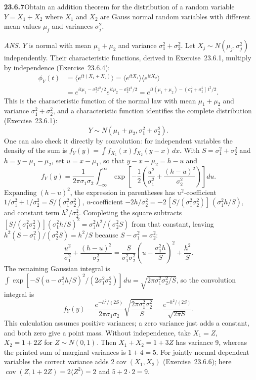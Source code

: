 \par\bigskip
\noindent\textbf{23.6.7}\quad Obtain an addition theorem for the
distribution of a random variable $Y=X_{1}+X_{2}$ where $X_{1}$
and $X_{2}$ are  Gauss normal random variables with different mean
values $\mu_{j}$ and variances $\sigma_{j}^{2}$.
\par\nobreak\hfill\emph{ANS.}\enspace
$Y$ is normal with mean $\mu_{1}+\mu_{2}$ and variance
$\sigma_{1}^{2}+\sigma_{2}^{2}$.
\solution
{}
Let $X_j\sim N(\mu_j,\sigma_j^2)$ independently. Their characteristic
functions, derived in Exercise~23.6.1, multiply by independence
(Exercise~23.6.4):
\begin{align*}
\phi_Y(t)&=\langle e^{it(X_1+X_2)}\rangle
=\langle e^{itX_1}\rangle\langle e^{itX_2}\rangle\\
&=e^{it\mu_1-\sigma_1^2t^2/2}
 e^{it\mu_2-\sigma_2^2t^2/2}
=e^{it(\mu_1+\mu_2)-(\sigma_1^2+\sigma_2^2)t^2/2}.
\end{align*}
This is the characteristic function of the normal law with mean
$\mu_1+\mu_2$ and variance $\sigma_1^2+\sigma_2^2$, and a characteristic
function identifies the complete distribution (Exercise~23.6.1):
\[
\boxed{Y\sim N(\mu_1+\mu_2,\sigma_1^2+\sigma_2^2)}.
\]
One can also check it directly by convolution: for independent
variables the density of the sum is
$f_Y(y)=\int f_{X_1}(x)f_{X_2}(y-x)\,dx$.
With $S=\sigma_1^2+\sigma_2^2$
and $h=y-\mu_1-\mu_2$, set $u=x-\mu_1$, so that $y-x-\mu_2=h-u$ and
\[
f_Y(y)=\frac1{2\pi\sigma_1\sigma_2}\int_{-\infty}^{\infty}
\exp\left[-\frac12\left(\frac{u^2}{\sigma_1^2}
+\frac{(h-u)^2}{\sigma_2^2}\right)\right]du.
\]
Expanding $(h-u)^2$, the expression in parentheses has $u^2$-coefficient
$1/\sigma_1^2+1/\sigma_2^2=S/(\sigma_1^2\sigma_2^2)$, $u$-coefficient
$-2h/\sigma_2^2=-2\,[S/(\sigma_1^2\sigma_2^2)]\,(\sigma_1^2h/S)$, and
constant term $h^2/\sigma_2^2$. Completing the square subtracts
$[S/(\sigma_1^2\sigma_2^2)](\sigma_1^2h/S)^2=\sigma_1^2h^2/(\sigma_2^2S)$
from that constant, leaving $h^2(S-\sigma_1^2)/(\sigma_2^2S)=h^2/S$
because $S-\sigma_1^2=\sigma_2^2$:
\[
\frac{u^2}{\sigma_1^2}+\frac{(h-u)^2}{\sigma_2^2}
=\frac S{\sigma_1^2\sigma_2^2}
 \left(u-\frac{\sigma_1^2h}{S}\right)^2+\frac{h^2}S.
\]
The remaining Gaussian integral is
$\int\exp[-S(u-\sigma_1^2h/S)^2/(2\sigma_1^2\sigma_2^2)]\,du
=\sqrt{2\pi\sigma_1^2\sigma_2^2/S}$, so the convolution integral is
\[
f_Y(y)=\frac{e^{-h^2/(2S)}}{2\pi\sigma_1\sigma_2}
 \sqrt{\frac{2\pi\sigma_1^2\sigma_2^2}{S}}
=\frac{e^{-h^2/(2S)}}{\sqrt{2\pi S}}.
\]
This calculation assumes positive variances; a zero variance just
adds a constant, and both zero give a point mass.
Without independence, take $X_1=Z$, $X_2=1+2Z$ for $Z\sim N(0,1)$.
Then $X_1+X_2=1+3Z$ has variance 9, whereas the printed sum of marginal
variances is $1+4=5$. For jointly normal dependent variables the
correct variance adds $2\operatorname{cov}(X_1,X_2)$
(Exercise~23.6.6); here $\operatorname{cov}(Z,1+2Z)=2\langle Z^2\rangle=2$
and $5+2\cdot2=9$.


